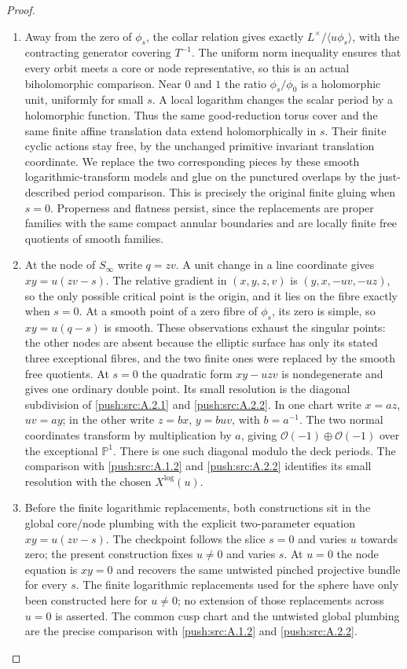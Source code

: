 \begin{proof}
\begin{enumerate}[label=\arabic*.,leftmargin=*]
\item Away from the zero of $\phi_s$, the collar relation gives exactly
$L^\times/\langle u\phi_s\rangle$, with the contracting generator
covering $T^{-1}$. The uniform norm inequality ensures that every
orbit meets a core or node representative, so this is an actual
biholomorphic comparison. Near $0$ and $1$ the ratio
$\phi_s/\phi_0$ is a holomorphic unit, uniformly for small $s$.
A local logarithm changes the scalar period by a holomorphic
function. Thus the same good-reduction torus cover and the same
finite affine translation data extend holomorphically in $s$.
Their finite cyclic actions stay free, by the unchanged primitive
invariant translation coordinate. We replace the two corresponding
pieces by these smooth logarithmic-transform models and glue on
the punctured overlaps by the just-described period comparison.
This is precisely the original finite gluing when $s=0$.
Properness and flatness persist, since the replacements are proper
families with the same compact annular boundaries and are locally
finite free quotients of smooth families.

\item At the node of $S_\infty$ write $q=zv$. A unit change in a line
coordinate gives $xy=u(zv-s)$. The relative gradient in
$(x,y,z,v)$ is $(y,x,-uv,-uz)$, so the only possible critical point
is the origin, and it lies on the fibre exactly when $s=0$.
At a smooth point of a zero fibre of $\phi_s$, its zero is simple,
so $xy=u(q-s)$ is smooth. These observations exhaust the singular
points: the other nodes are absent because the elliptic surface
has only its stated three exceptional fibres, and the two finite
ones were replaced by the smooth free quotients. At $s=0$ the
quadratic form $xy-uzv$ is nondegenerate and gives one ordinary
double point. Its small resolution is the diagonal subdivision of \cref{push:src:A.2.1} and \cref{push:src:A.2.2}. In one chart write $x=az$, $uv=ay$; in the other write
$z=bx$, $y=buv$, with $b=a^{-1}$. The two normal coordinates
transform by multiplication by $a$, giving
$\mathcal O(-1)\oplus\mathcal O(-1)$ over the exceptional
$\mathbb P^1$. There is one such diagonal modulo the deck periods.
The comparison with \cref{push:src:A.1.2} and \cref{push:src:A.2.2} identifies its small resolution with the
chosen $X^{\log}(u)$.

\item Before the finite logarithmic replacements, both constructions sit in
the global core/node plumbing with the explicit two-parameter equation
$xy=u(zv-s)$. The checkpoint follows the slice $s=0$ and varies
$u$ towards zero; the present construction fixes $u\ne0$ and varies
$s$. At $u=0$ the node equation is $xy=0$ and recovers the same
untwisted pinched projective bundle for every $s$. The finite
logarithmic replacements used for the sphere have only been constructed
here for $u\ne0$; no extension of those replacements across $u=0$
is asserted. The common cusp chart and the untwisted global plumbing
are the precise comparison with \cref{push:src:A.1.2} and \cref{push:src:A.2.2}.
\end{enumerate}
\end{proof}

